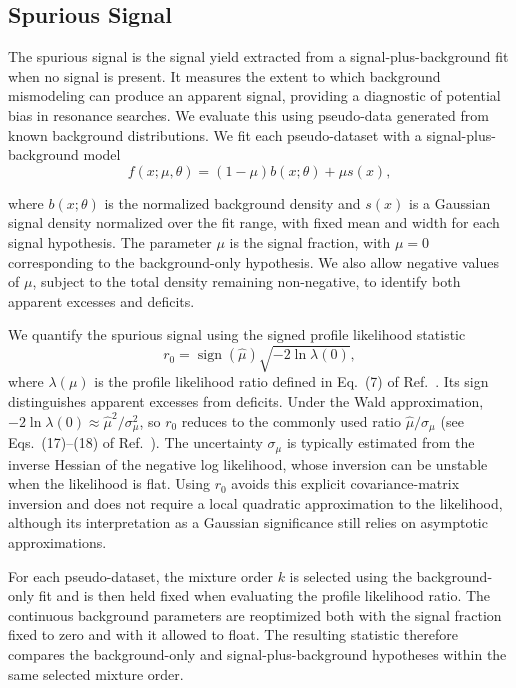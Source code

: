 \documentclass[a4paper,11pt]{article}
\begin{document}
\subsection*{Spurious Signal}
The spurious signal is the signal yield extracted from a signal-plus-background fit when no signal is present. It measures the extent to which background mismodeling can produce an apparent signal, providing a diagnostic of potential bias in resonance searches. We evaluate this using pseudo-data generated from known background distributions. We fit each pseudo-dataset with a signal-plus-background model
\begin{equation}
f(x;\mu,\theta)=(1-\mu)b(x;\theta)+\mu s(x),
\end{equation}

where \(b(x;\theta)\) is the normalized background density and \(s(x)\) is a Gaussian signal density normalized over the fit range, with fixed mean and width for each signal hypothesis. The parameter \(\mu\) is the signal fraction, with \(\mu=0\) corresponding to the background-only hypothesis. We also allow negative values of \(\mu\), subject to the total density remaining non-negative, to identify both apparent excesses and deficits.

We quantify the spurious signal using the signed profile likelihood statistic
\begin{equation}
r_0 = \operatorname{sign}(\hat{\mu})\sqrt{-2\ln\lambda(0)},
\end{equation}
where $\lambda(\mu)$ is the profile likelihood ratio defined in Eq.~(7) of Ref.~\cite{Cowan_2011}. Its sign distinguishes apparent excesses from deficits. Under the Wald approximation,
$-2\ln\lambda(0)\approx\hat{\mu}^2/\sigma_\mu^2$, so $r_0$ reduces to the commonly used ratio $\hat{\mu}/\sigma_\mu$ (see Eqs.~(17)--(18) of Ref.~\cite{Cowan_2011}). The uncertainty $\sigma_\mu$ is typically estimated from the inverse Hessian of the negative log likelihood, whose inversion can be unstable when the likelihood is flat. Using $r_0$ avoids this explicit covariance-matrix inversion and does not require a local quadratic approximation to the likelihood, although its interpretation as a Gaussian significance still relies on asymptotic approximations.

For each pseudo-dataset, the mixture order $k$ is selected using the background-only fit and is then held fixed when evaluating the profile likelihood ratio. The continuous background parameters are reoptimized both with the signal fraction fixed to zero and with it allowed to float. The resulting statistic therefore compares the background-only and signal-plus-background hypotheses within the same selected mixture order.
\end{document}
